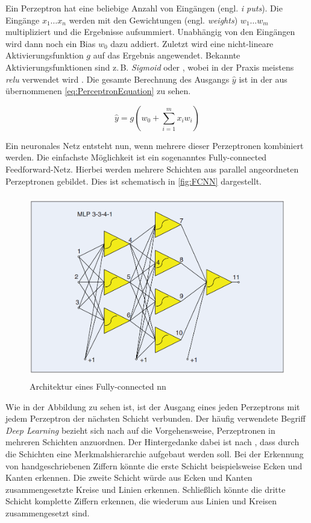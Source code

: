 Ein Perzeptron hat eine beliebige Anzahl von Eingängen (engl. \emph{i puts}).
Die Eingänge $x_1 \dots x_n$ werden mit den Gewichtungen (engl. \emph{weights}) $w_1 \dots w_m$ multipliziert und die Ergebnisse aufsummiert.
Unabhängig von den Eingängen wird dann noch ein Bias $w_0$ dazu addiert.
Zuletzt wird eine nicht-lineare Aktivierungsfunktion $g$ auf das Ergebnis angewendet.
Bekannte Aktivierungsfunktionen sind z.\,B. \emph{Sigmoid} oder \emph{}, wobei in der Praxis meistens \emph{\acrshort{relu}} verwendet wird \cite{ActivFuncSharma,ActivFuncNwankpa}.
Die gesamte Berechnung des Ausgangs $\hat{y}$ ist in der aus \cite{6S191Intro} übernommenen \autoref{eq:PerceptronEquation} zu sehen.

\begin{equation}
    \hat{y} = g\left(w_0 + \sum_{i=1}^{m} x_i w_i \right)  
\label{eq:PerceptronEquation}
\end{equation}

Ein neuronales Netz entsteht nun, wenn mehrere dieser Perzeptronen kombiniert werden.
Die einfachste Möglichkeit ist ein sogenanntes Fully-connected Feedforward-Netz.
Hierbei werden mehrere Schichten aus parallel angeordneten Perzeptronen gebildet.
Dies ist schematisch in \autoref{fig:FCNN} dargestellt.

\begin{figure}[h]
    \centering
    \includegraphics[width=1\textwidth,height=8cm,keepaspectratio=true]{content/images/FCNN.png}
    \caption{Architektur eines Fully-connected \acrshort{nn} \cite[FIGURE 1]{NNArchitectures}}
    \label{fig:FCNN}
\end{figure}

Wie in der Abbildung zu sehen ist, ist der Ausgang eines jeden Perzeptrons mit jedem Perzeptron der nächsten Schicht verbunden.
Der häufig verwendete Begriff \emph{Deep Learning} bezieht sich nach \cite[S. 27]{DeepLearningPythonKeras} auf die Vorgehensweise, Perzeptronen in mehreren Schichten anzuordnen.
Der Hintergedanke dabei ist nach \cite{6S191Intro}, dass durch die Schichten eine Merkmalshierarchie aufgebaut werden soll.
Bei der Erkennung von handgeschriebenen Ziffern könnte die erste Schicht beispielsweise Ecken und Kanten erkennen.
Die zweite Schicht würde aus Ecken und Kanten zusammengesetzte Kreise und Linien erkennen.
Schließlich könnte die dritte Schicht komplette Ziffern erkennen, die wiederum aus Linien und Kreisen zusammengesetzt sind.

